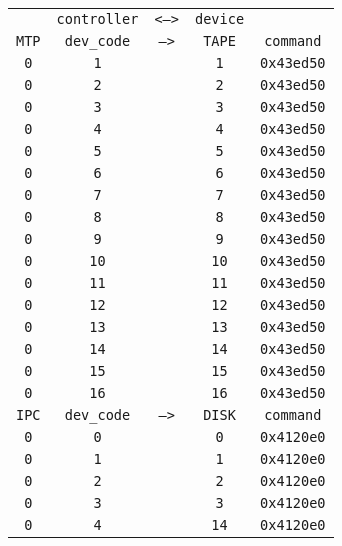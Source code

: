 \begin{adjustwidth}{5ex}{1ex}
	\begin{tabular}{ccccc}
		& \texttt{controller} & \texttt{<-->} & \texttt{device} &  \\
		\texttt{MTP} & \texttt{dev\_code} & \texttt{-->} & \texttt{TAPE} & \texttt{command} \\
		\texttt{0} & \texttt{1} & & \texttt{1} & \texttt{0x43ed50} \\
		\texttt{0} & \texttt{2} & & \texttt{2} & \texttt{0x43ed50} \\
		\texttt{0} & \texttt{3} & & \texttt{3} & \texttt{0x43ed50} \\
		\texttt{0} & \texttt{4} & & \texttt{4} & \texttt{0x43ed50} \\
		\texttt{0} & \texttt{5} & & \texttt{5} & \texttt{0x43ed50} \\
		\texttt{0} & \texttt{6} & & \texttt{6} & \texttt{0x43ed50} \\
		\texttt{0} & \texttt{7} & & \texttt{7} & \texttt{0x43ed50} \\
		\texttt{0} & \texttt{8} & & \texttt{8} & \texttt{0x43ed50} \\
		\texttt{0} & \texttt{9} & & \texttt{9} & \texttt{0x43ed50} \\
		\texttt{0} & \texttt{10} & & \texttt{10} & \texttt{0x43ed50} \\
		\texttt{0} & \texttt{11} & & \texttt{11} & \texttt{0x43ed50} \\
		\texttt{0} & \texttt{12} & & \texttt{12} & \texttt{0x43ed50} \\
		\texttt{0} & \texttt{13} & & \texttt{13} & \texttt{0x43ed50} \\
		\texttt{0} & \texttt{14} & & \texttt{14} & \texttt{0x43ed50} \\
		\texttt{0} & \texttt{15} & & \texttt{15} & \texttt{0x43ed50} \\
		\texttt{0} & \texttt{16} & & \texttt{16} & \texttt{0x43ed50} \\
		\texttt{IPC} & \texttt{dev\_code} & \texttt{-->} & \texttt{DISK} & \texttt{command} \\
		\texttt{0} & \texttt{0} & & \texttt{0} & \texttt{0x4120e0} \\
		\texttt{0} & \texttt{1} & & \texttt{1} & \texttt{0x4120e0} \\
		\texttt{0} & \texttt{2} & & \texttt{2} & \texttt{0x4120e0} \\
		\texttt{0} & \texttt{3} & & \texttt{3} & \texttt{0x4120e0} \\
		\texttt{0} & \texttt{4} & & \texttt{14} & \texttt{0x4120e0} \\

\end{tabular}
\end{adjustwidth}
